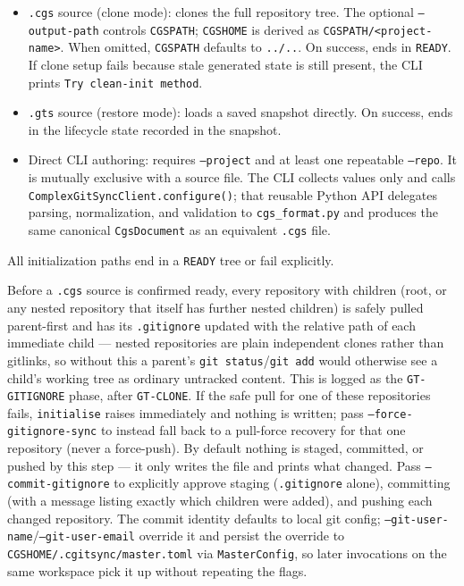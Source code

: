 \begin{itemize}
  \item \texttt{.cgs} source (clone mode): clones the full repository tree.
    The optional \texttt{--output-path} controls
    \texttt{CGSPATH}; \texttt{CGSHOME} is derived as
    \texttt{CGSPATH/<project-name>}. When omitted, \texttt{CGSPATH} defaults to
    \texttt{../..}.  On success, ends in \texttt{READY}.  If clone setup fails
    because stale generated state is still present, the CLI prints
    \texttt{Try clean-init method}.
  \item \texttt{.gts} source (restore mode): loads a saved snapshot directly.
    On success, ends in the lifecycle state recorded in the snapshot.
  \item Direct CLI authoring: requires \texttt{--project} and at least one
    repeatable \texttt{--repo}. It is mutually exclusive with a source file.
    The CLI collects values only and calls
    \texttt{ComplexGitSyncClient.configure()}; that reusable Python API
    delegates parsing, normalization, and validation to \texttt{cgs\_format.py}
    and produces the same canonical \texttt{CgsDocument} as an equivalent
    \texttt{.cgs} file.
\end{itemize}

All initialization paths end in a \texttt{READY} tree or fail explicitly.

Before a \texttt{.cgs} source is confirmed ready, every repository with
children (root, or any nested repository that itself has further nested
children) is safely pulled parent-first and has its \texttt{.gitignore}
updated with the relative path of each immediate child --- nested
repositories are plain independent clones rather than gitlinks, so without
this a parent's \texttt{git status}/\texttt{git add} would otherwise see a
child's working tree as ordinary untracked content. This is logged as the
\texttt{GT-GITIGNORE} phase, after \texttt{GT-CLONE}. If the safe pull for
one of these repositories fails, \texttt{initialise} raises immediately and
nothing is written; pass \texttt{--force-gitignore-sync} to instead fall
back to a pull-force recovery for that one repository (never a force-push).
By default nothing is staged, committed, or pushed by this step --- it only
writes the file and prints what changed. Pass \texttt{--commit-gitignore}
to explicitly approve staging (\texttt{.gitignore} alone), committing (with
a message listing exactly which children were added), and pushing each
changed repository. The commit identity defaults to local git config;
\texttt{--git-user-name}/\texttt{--git-user-email} override it and persist
the override to \texttt{CGSHOME/.cgitsync/master.toml} via
\texttt{MasterConfig}, so later invocations on the same workspace pick it up
without repeating the flags.

